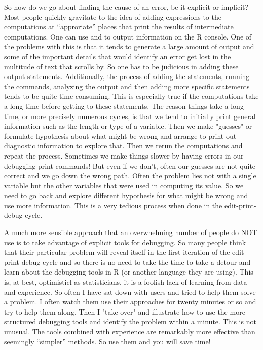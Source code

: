 {So how do we go about finding the cause of an error, be it explicit or
implicit? Most people quickly gravitate to the idea of adding
expressions to the computations at ``approriate'' places that print
the results of intermediate computations. One can use
 and  to output information on the R
console. One of the problems with this is that it tends to generate a
large amount of output and some of the important details that would
identify an error get lost in the multitude of text that scrolls
by. So one has to be judicious in adding these output
statements. Additionally, the process of adding the 
statements, running the commands, analyzing the output and then adding
more specific  statements tends to be quite time
consuming. This is especially true if the computations take a long
time before getting to these  statements. The reason
things take a long time, or more precisely numerous cycles, is that we
tend to initially print general information such as the length or type
of a variable. Then we make "guesses" or formulate hypothesis about
what might be wrong and arrange to print out diagnostic information to
explore that. Then we rerun the computations and repeat the
process. Sometimes we make things slower by having errors in our
debugging print commands! But even if we don't, often our guesses are
not quite correct and we go down the wrong path. Often the problem
lies not with a single variable but the other variables that were used
in computing its value. So we need to go back and explore different
hypothesis for what might be wrong and use more information. This is a
very tedious process when done in the edit-print-debug cycle.

A much more sensible approach that an overwhelming number of people do
NOT use is to take advantage of explicit tools for debugging. So many
people think that their particular problem will reveal itself in the
first iteration of the edit-print-debug cycle and so there is no need
to take the time to take a detour and learn about the debugging tools
in R (or another language they are using). This is, at best,
optimisticl as statisticians, it is a foolish lack of learning from
data and experience. So often I have sat down with users and tried to
help them solve a problem. I often watch them use their approaches for
twenty minutes or so and try to help them along. Then I "take over"
and illustrate how to use the more structured debugging tools and
identify the problem within a minute. This is not unusual. The tools
combined with experience are remarkably more effective than seemingly
``simpler'' methods. So use them and you will save time!

}
